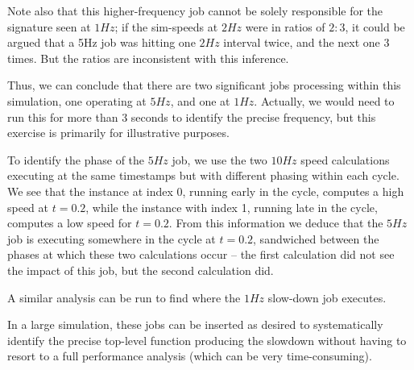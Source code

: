 \documentclass[11pt,fleqn]{report}
\begin{document}
Note also that this higher-frequency job cannot be solely responsible for the
signature seen at $1 Hz$; if the sim-speeds at $2 Hz$ were in ratios of $2:3$,
it could be argued that a 5Hz job was hitting one $2 Hz$ interval twice,
and the next one 3 times. But the ratios are inconsistent with this
inference.

Thus, we can conclude that there are two significant jobs processing within
this simulation, one operating at $5 Hz$, and one at $1 Hz$.  Actually, we
would need to run this for more than 3 seconds to identify the precise
frequency, but this exercise is primarily for illustrative purposes.

To identify the phase of the $5 Hz$ job, we use the two $10 Hz$ speed
calculations
executing at the same timestamps but with different phasing within each cycle.
We see that the instance at index 0, running early in the cycle, computes a
high speed at $t=0.2$, while the instance with index 1, running late in the
cycle, computes a low speed for $t=0.2$. From this information we deduce that
the $5 Hz$ job is executing somewhere in the cycle at $t=0.2$, sandwiched
between the phases at which these two calculations occur -- the first
calculation did not see the impact of this job, but the second calculation
did.

A similar analysis can be run to find where the $1 Hz$ slow-down job executes.

In a large simulation, these jobs can be inserted as desired to systematically
identify the precise top-level function producing the slowdown without having
to resort to a full performance analysis (which can be very
time-consuming).
\end{document}
